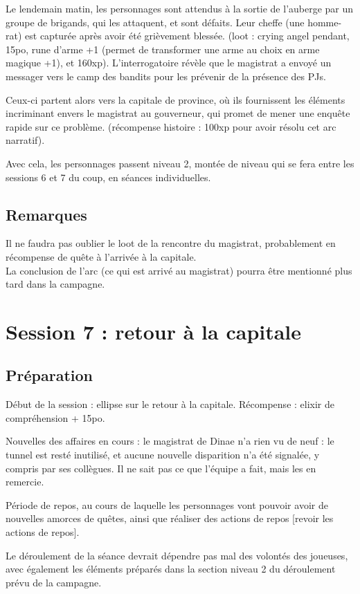 \documentclass[10pt,a4paper]{book}
\begin{document}
Le lendemain matin, les personnages sont attendus à la sortie de l'auberge par un groupe de brigands, qui les attaquent, et sont défaits. Leur cheffe (une homme-rat) est capturée après avoir été grièvement blessée. (loot : crying angel pendant, 15po, rune d'arme +1 (permet de transformer une arme au choix en arme magique +1), et 160xp). L'interrogatoire révèle que le magistrat a envoyé un messager vers le camp des bandits pour les prévenir de la présence des PJs.

Ceux-ci partent alors vers la capitale de province, où ils fournissent les éléments incriminant envers le magistrat au gouverneur, qui promet de mener une enquête rapide sur ce problème. (récompense histoire : 100xp pour avoir résolu cet arc narratif).

Avec cela, les personnages passent niveau 2, montée de niveau qui se fera entre les sessions 6 et 7 du coup, en séances individuelles.
\subsection{Remarques}
Il ne faudra pas oublier le loot de la rencontre du magistrat, probablement en récompense de quête à l'arrivée à la capitale.\\
La conclusion de l'arc (ce qui est arrivé au magistrat) pourra être mentionné plus tard dans la campagne.
\section{Session 7 : retour à la capitale}
\subsection{Préparation}
Début de la session : ellipse sur le retour à la capitale. Récompense : elixir de compréhension + 15po.

Nouvelles des affaires en cours : le magistrat de Dinae n'a rien vu de neuf : le tunnel est resté inutilisé, et aucune nouvelle disparition n'a été signalée, y compris par ses collègues. Il ne sait pas ce que l'équipe a fait, mais les en remercie.

Période de repos, au cours de laquelle les personnages vont pouvoir avoir de nouvelles amorces de quêtes, ainsi que réaliser des actions de repos [revoir les actions de repos].

Le déroulement de la séance devrait dépendre pas mal des volontés des joueuses, avec également les éléments préparés dans la section niveau 2 du déroulement prévu de la campagne.
\end{document}
